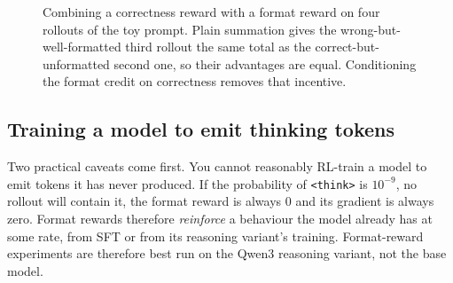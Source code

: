 \begin{figure}[ht]
\centering
{}
\caption{Combining a correctness reward with a format reward on four rollouts of the toy
prompt. Plain summation gives the wrong-but-well-formatted third rollout the same total as
the correct-but-unformatted second one, so their advantages are equal. Conditioning the
format credit on correctness removes that incentive.}
\label{fig:grpo2:formatfig}
\end{figure}

\subsection{Training a model to emit thinking tokens}\label{sec:grpo2:formattrain}

Two practical caveats come first. You cannot reasonably RL-train a model to emit tokens it
has never produced. If the probability of \verb|<think>| is $10^{-9}$, no rollout will contain it,
the format reward is always 0 and its gradient is always zero. Format rewards therefore
\emph{reinforce} a behaviour the model already has at some rate, from SFT or from its reasoning
variant's training. Format-reward experiments are therefore best run on the
Qwen3 reasoning variant, not the base model.

